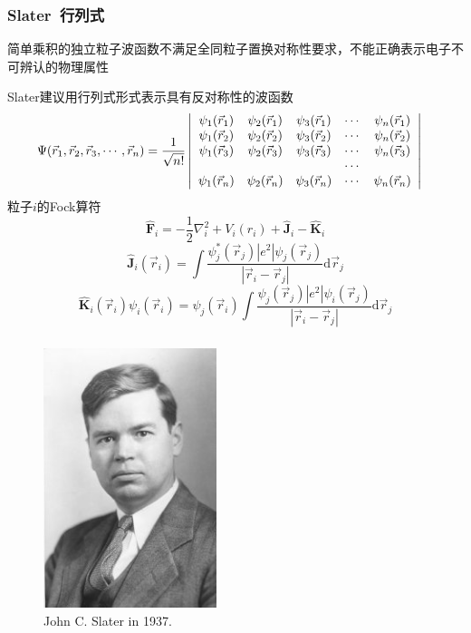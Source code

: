 \frame
{
	\frametitle{\textrm{Slater~}行列式}
	简单乘积的独立粒子波函数不满足全同粒子置换对称性要求，不能正确表示电子不可辨认的物理属性
	
	\textrm{Slater}建议用行列式形式表示具有反对称性的波函数
	\begin{displaymath}
		\hspace*{-10pt}\Psi(\vec r_1,\vec r_2,\vec r_3,\cdots,\vec r_n)=\dfrac1{\sqrt{n!}}
		\left|\begin{array}{ccccc}
			\psi_1(\vec r_1)&\psi_2(\vec r_1)&\psi_3(\vec r_1)&\cdots&\psi_n(\vec r_1)\\
			\psi_1(\vec r_2)&\psi_2(\vec r_2)&\psi_3(\vec r_2)&\cdots&\psi_n(\vec r_2)\\
			\psi_1(\vec r_3)&\psi_2(\vec r_3)&\psi_3(\vec r_3)&\cdots&\psi_n(\vec r_3)\\
			&&&\cdots&\\
			\psi_1(\vec r_n)&\psi_2(\vec r_n)&\psi_3(\vec r_n)&\cdots&\psi_n(\vec r_n)
		\end{array}\right|
	\end{displaymath}
	粒子$i$的\textrm{Fock}算符
	$$\hat{\mathbf F}_i=-\dfrac{1}{2}\nabla_i^2+V_i(r_i)+\hat{\mathbf J}_i-\hat{\mathbf K}_i$$
	$$\hat{\mathbf J}_i(\vec r_i)=\int\dfrac{\psi_j^{\ast}(\vec r_j)|e^2|\psi_j(\vec r_j)}{|\vec r_i-\vec r_j|}\mathrm{d}\vec r_j$$
	$$\hat{\mathbf K}_i(\vec r_i)\psi_i(\vec r_i)=\psi_j(\vec r_i)\int\dfrac{\psi_j(\vec r_j)|e^2|\psi_i(\vec r_j)}{|\vec r_i-\vec r_j|}\mathrm{d}\vec r_j$$

}

\frame
{
	\frametitle{}
\begin{figure}[h!]
\centering
\vspace{-0.5pt}
\includegraphics[height=0.65\textwidth,width=0.45\textwidth,viewport=0 0 210 310,clip]{Figures/John-C-Slater_1937.jpg}
\caption{\tiny\textrm{John C. Slater in 1937.}}
\label{Fig_Slater}
\end{figure}
}

